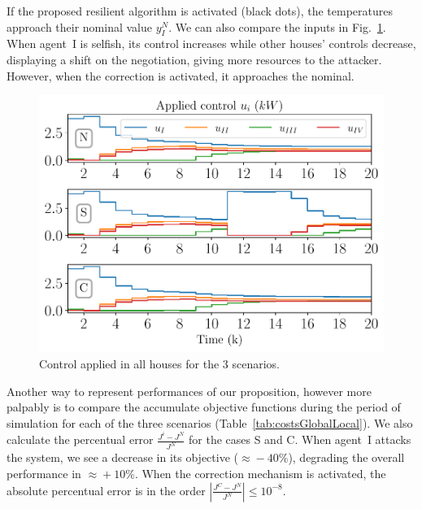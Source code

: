 \documentclass[../main.tex]{subfiles}
\begin{document}
If the proposed resilient algorithm is activated (black dots), the temperatures approach their nominal value $y_{I}^{N}$.
We can also compare the inputs in Fig.~\ref{fig:control_3Scenarios}.
When agent~I is selfish, its control increases while other houses' controls decrease,
displaying a shift on the negotiation, giving more resources to the attacker.
However, when the correction is activated, it approaches the nominal.
\begin{figure}[h]
  \centering
 \includegraphics[width=.7\textwidth,trim=0 .1cm 0 .3cm,clip]{../img/resilient_ineq/control.pdf}
  \caption{Control applied in all houses for the 3 scenarios.}\label{fig:control_3Scenarios}
\end{figure}



Another way to represent performances of our proposition, however more palpably is to compare the accumulate objective functions during the period of simulation for each of the three scenarios (Table~\ref{tab:costsGlobalLocal}).
We also calculate the percentual error ${\frac{J^{i}-J^{N}}{J^{N}}}$ for the cases S and C.
When agent~I attacks the system, we see a decrease in its objective ($\approx\!-40\%$), degrading the overall performance in $\approx\!+10\%$.
When the correction mechanism is activated, the absolute percentual error is in the order ${|\frac{J^{C}-J^{N}}{J^{N}}|\leq10^{-8}}$.
\end{document}
